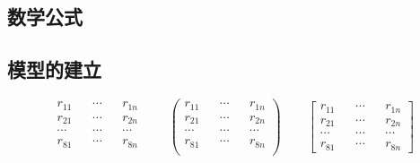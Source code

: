 \documentclass{cumcmthesis}
\begin{document}
\begin{appendices}
\section{数学公式}

\subsection{模型的建立}
\begin{equation}
    \begin{matrix} 
        r_{11}  &&    \cdots  &&  r_{1n}  \\
        r_{21}  &&  \cdots  &&  r_{2n}    \\ 
        \cdots  &&  \cdots  &&  \cdots    \\
        r_{81}  &&  \cdots  &&  r_{8n}    \\ 
    \end{matrix} 
    \quad\quad
    \begin{pmatrix} 
        r_{11}  &&  \cdots  &&  r_{1n}  \\
        r_{21}  &&  \cdots  &&  r_{2n}  \\ 
        \cdots  &&  \cdots  &&  \cdots  \\
        r_{81}  &&  \cdots  &&  r_{8n}  \\ 
    \end{pmatrix} 
    \quad\quad
    \begin{bmatrix} 
        r_{11}  &&  \cdots  &&  r_{1n}  \\
        r_{21}  &&  \cdots  &&  r_{2n}  \\ 
        \cdots  &&  \cdots  &&  \cdots  \\
        r_{81}  &&  \cdots  &&  r_{8n}  
    \end{bmatrix} 
\end{equation}


\end{appendices}
\end{document}
